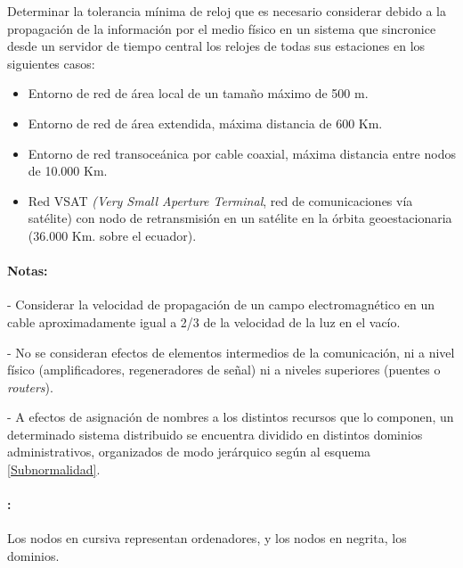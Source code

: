   \begin{problem}
  Determinar la tolerancia mínima de reloj que es necesario considerar
  debido a la propagación de la información por el medio físico en un sistema
  que sincronice desde un servidor de tiempo central los relojes de todas
  sus estaciones en los siguientes casos:
  \begin{itemize}
    \item Entorno de red de área local de un tamaño máximo de 500 m.
    \item Entorno de red de área extendida, máxima distancia de 600 Km.
    \item Entorno de red transoceánica por cable coaxial, máxima distancia entre
nodos de 10.000 Km.
    \item Red VSAT \textit{(Very Small Aperture Terminal}, red de comunicaciones vía
satélite) con nodo de retransmisión en un satélite en la órbita geoestacionaria
(36.000 Km. sobre el ecuador).
  \end{itemize}
  \paragraph{Notas: }
  - Considerar la velocidad de propagación de un campo electromagnético 
en un cable aproximadamente igual a 2/3 de la velocidad de la luz en el 
vacío.

  - No se consideran efectos de elementos intermedios de la comunicación,
  ni a nivel físico (amplificadores,  regeneradores de señal) ni a niveles
  superiores (puentes o \textit{routers}).
  
  - A efectos de asignación de nombres a los distintos recursos
  que lo componen, un determinado sistema distribuido se encuentra dividido
  en distintos dominios administrativos, organizados de modo jerárquico
  según al esquema \ref{Subnormalidad}. 


  \paragraph{:} Los nodos en cursiva representan ordenadores, y los nodos en negrita, los dominios.

\end{problem}
